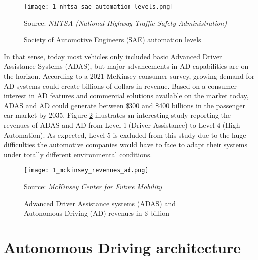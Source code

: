 \begin{figure}[h]
	\centering
	\texttt{[image: 1\_nhtsa\_sae\_automation\_levels.png]}
	\caption{Society of Automotive Engineers (SAE) automation levels}
    Source: \textit{NHTSA (National Highway Traffic Safety Administration)}
	\label{fig:1_nhtsa_sae_automation_levels}
\end{figure}

In that sense, today most vehicles only included basic Advanced Driver Assistance Systems (ADAS), but major advancements in AD capabilities are on the horizon. According to a 2021 McKinsey consumer survey, growing demand for \ac{AD} systems could create billions of dollars in revenue. Based on a consumer interest in \ac{AD} features and commercial solutions available on the market today, ADAS and AD could generate between \$300 and \$400 billions in the passenger car market by 2035. Figure \ref{fig:1_mckinsey_revenues_ad} illustrates an interesting study reporting the revenues of ADAS and AD from Level 1 (Driver Assistance) to Level 4 (High Automation). As expected, Level 5 is excluded from this study due to the huge difficulties the automotive companies would have to face to adapt their systems under totally different environmental conditions.

\begin{figure}[h]
	\centering
	\texttt{[image: 1\_mckinsey\_revenues\_ad.png]}
	\caption{Advanced Driver Assistance systems (ADAS) and \\ Autonomous Driving (AD) revenues in \$ billion} Source: \textit{McKinsey Center for Future Mobility}
	\label{fig:1_mckinsey_revenues_ad}
\end{figure}

\section{Autonomous Driving architecture}
\label{sec:1_ad_architecture}

